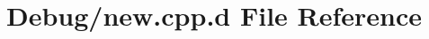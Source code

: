 \hypertarget{_debug_2new_8cpp_8d}{\section{\-Debug/new.cpp.\-d \-File \-Reference}
\label{_debug_2new_8cpp_8d}
}
